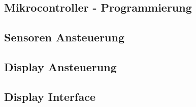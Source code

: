 \begin{inhalt}
\renewcommand*\chapterpagestyle{scrheadings}
\chapter{Mikrocontroller - Programmierung}

\section{Sensoren Ansteuerung}
\section{Display Ansteuerung}
\section{Display Interface}



\end{inhalt}